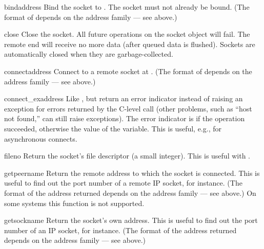 \begin{methoddesc}[socket]{bind}{address}
Bind the socket to .  The socket must not already be bound.
(The format of  depends on the address family --- see above.)
\end{methoddesc}

\begin{methoddesc}[socket]{close}{}
Close the socket.  All future operations on the socket object will fail.
The remote end will receive no more data (after queued data is flushed).
Sockets are automatically closed when they are garbage-collected.
\end{methoddesc}

\begin{methoddesc}[socket]{connect}{address}
Connect to a remote socket at .
(The format of  depends on the address family --- see
above.)
\end{methoddesc}

\begin{methoddesc}[socket]{connect_ex}{address}
Like , but return an error indicator
instead of raising an exception for errors returned by the C-level
 call (other problems, such as ``host not found,''
can still raise exceptions).  The error indicator is  if the
operation succeeded, otherwise the value of the 
variable.  This is useful, e.g., for asynchronous connects.
\end{methoddesc}

\begin{methoddesc}[socket]{fileno}{}
Return the socket's file descriptor (a small integer).  This is useful
with .
\end{methoddesc}

\begin{methoddesc}[socket]{getpeername}{}
Return the remote address to which the socket is connected.  This is
useful to find out the port number of a remote IP socket, for instance.
(The format of the address returned depends on the address family ---
see above.)  On some systems this function is not supported.
\end{methoddesc}

\begin{methoddesc}[socket]{getsockname}{}
Return the socket's own address.  This is useful to find out the port
number of an IP socket, for instance.
(The format of the address returned depends on the address family ---
see above.)
\end{methoddesc}


